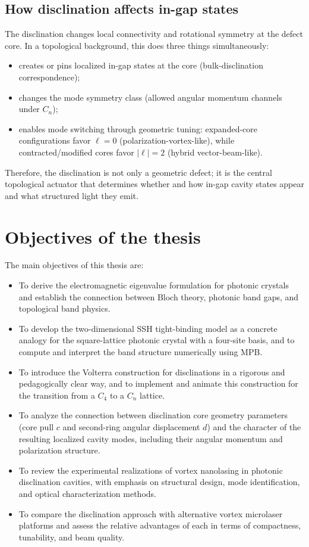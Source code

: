 \documentclass[12pt,a4paper,oneside]{book}
\theoremstyle{plain}
\theoremstyle{definition}
\theoremstyle{remark}
\begin{document}
\subsection{How disclination affects in-gap states}

The disclination changes local connectivity and rotational symmetry at the defect core. In a topological background, this does three things simultaneously:
\begin{itemize}
  \item creates or pins localized in-gap states at the core (bulk-disclination correspondence);
  \item changes the mode symmetry class (allowed angular momentum channels under $C_n$);
  \item enables mode switching through geometric tuning: expanded-core configurations favor $\ell=0$ (polarization-vortex-like), while contracted/modified cores favor $|\ell|=2$ (hybrid vector-beam-like).
\end{itemize}
Therefore, the disclination is not only a geometric defect; it is the central topological actuator that determines whether and how in-gap cavity states appear and what structured light they emit.

\section{Objectives of the thesis}
\label{sec:objectives}

The main objectives of this thesis are:

\begin{itemize}
  \item To derive the electromagnetic eigenvalue formulation for photonic crystals and establish the connection between Bloch theory, photonic band gaps, and topological band physics.
  \item To develop the two-dimensional SSH tight-binding model as a concrete analogy for the square-lattice photonic crystal with a four-site basis, and to compute and interpret the band structure numerically using MPB.
  \item To introduce the Volterra construction for disclinations in a rigorous and pedagogically clear way, and to implement and animate this construction for the transition from a $C_4$ to a $C_n$ lattice.
  \item To analyze the connection between disclination core geometry parameters (core pull $c$ and second-ring angular displacement $d$) and the character of the resulting localized cavity modes, including their angular momentum and polarization structure.
  \item To review the experimental realizations of vortex nanolasing in photonic disclination cavities, with emphasis on structural design, mode identification, and optical characterization methods.
  \item To compare the disclination approach with alternative vortex microlaser platforms and assess the relative advantages of each in terms of compactness, tunability, and beam quality.
\end{itemize}
\end{document}
